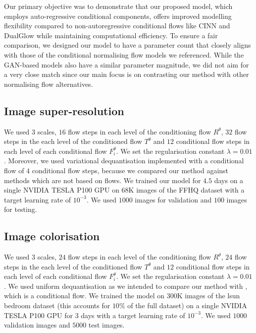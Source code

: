 Our primary objective was to demonstrate that our proposed model, which employs auto-regressive conditional components, offers improved modelling flexibility compared to non-autoregressive conditional flows like CINN and DualGlow while maintaining computational efficiency. To ensure a fair comparison, we designed our model to have a parameter count that closely aligns with those of the conditional normalising flow models we referenced. While the GAN-based models also have a similar parameter magnitude, we did not aim for a very close match since our main focus is on contrasting our method with other normalising flow alternatives.
\color{black}

\subsection{Image super-resolution}
We used $3$ scales, $16$ flow steps in each level of the conditioning flow $R^\theta$, $32$ flow steps in the each level of the conditioned flow $T^\theta$ and $12$ conditional flow steps in each level of each conditional flow $F_i^{\theta}$. We set the regularisation constant $\lambda = 0.01$. Moreover, we used variational dequantisation implemented with a conditional flow of $4$ conditional flow steps, because we compared our method against methods which are not based on flows. We trained our model for $4.5$ days on a single NVIDIA TESLA P100 GPU on $68$K images of the FFHQ dataset with a target learning rate of $10^{-3}$. We used $1000$ images for validation and $100$ images for testing.


\subsection{Image colorisation}

We used $3$ scales, $24$ flow steps in each level of the conditioning flow $R^\theta$, $24$ flow steps in the each level of the conditioned flow $T^\theta$ and $12$ conditional flow steps in each level of each conditional flow $F_i^{\theta}$. We set the regularisation constant $\lambda = 0.01$. We used uniform dequantisation as we intended to compare our method with \cite{ardizzone2019guided}, which is a conditional flow. We trained the model on $300$K images of the lsun bedroom dataset (this accounts for $10\%$ of the full dataset) on a single NVIDIA TESLA P100 GPU for 3 days with a target learning rate of $10^{-3}$. We used $1000$ validation images and $5000$ test images.

